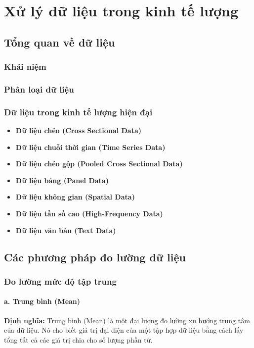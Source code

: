 \chapter{Xử lý dữ liệu trong kinh tế lượng}
\section{Tổng quan về dữ liệu}
\subsection{Khái niệm}
\subsection{Phân loại dữ liệu}
\subsection{Dữ liệu trong kinh tế lượng hiện đại}
\begin{itemize}
    \item \textbf{Dữ liệu chéo (Cross Sectional Data)}
    \item \textbf{Dữ liệu chuỗi thời gian (Time Series Data)}
    \item \textbf{Dữ liệu chéo gộp (Pooled Cross Sectional Data)}
    \item \textbf{Dữ liệu bảng (Panel Data)}
    \item \textbf{Dữ liệu không gian (Spatial Data)}
    \item \textbf{Dữ liệu tần số cao (High-Frequency Data)}
    \item \textbf{Dữ liệu văn bản (Text Data)}
\end{itemize}

\section{Các phương pháp đo lường dữ liệu}
\subsection{Đo lường mức độ tập trung}
\subsubsection{a. Trung bình (Mean)}
\textbf{Định nghĩa: }
Trung bình (Mean) là một đại lượng đo lường xu hướng trung tâm của dữ liệu. Nó cho biết giá trị đại diện của một tập hợp dữ liệu bằng cách lấy tổng tất cả các giá trị chia cho số lượng phần tử.

